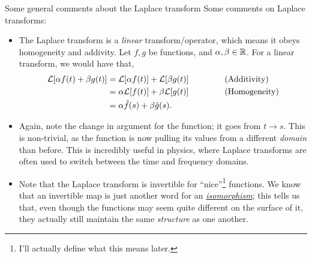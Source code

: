 \documentclass[11pt]{article}
\theoremstyle{mystyle}
\begin{document}
\begin{psremark}{Some general comments about the Laplace transform}{}
    Some comments on Laplace transforms:
    \begin{itemize}
        \item The Laplace transform is a \emph{linear} transform/operator,
        which means it obeys homogeneity and addivity. Let $f, g$
        be functions, and $\alpha, \beta \in \mathbb{R}$. 
        For a linear transform, we would have that,
        \begin{align*}
            \mathcal{L}[\alpha f(t) + \beta g(t)] & = \mathcal{L}[\alpha f(t)] + \mathcal{L}[\beta g(t)] \hspace{1.5cm} \text{(Additivity)}\\
            & = \alpha \mathcal{L}[f(t)] + \beta \mathcal{L}[g(t)] \hspace{1.5cm} \text{(Homogeneity)}\\
            & = \alpha \tilde{f}(s) + \beta \tilde{g}(s).
        \end{align*}
        \item Again, note the change in argument for the function;
        it goes from $t \to s$. This is non-trivial, as the function
        is now pulling its values from a different \emph{domain}
        than before. This is incredibly useful in physics,
        where Laplace transforms are often used to switch
        between the time and frequency domains.
        \item Note that the Laplace transform is invertible
        for ``nice''\footnote{I'll actually define what this means later.} functions.
        We know that an invertible map is just another word for 
        an \href{https://en.wikipedia.org/wiki/Isomorphism}{\emph{isomorphism}}; this tells us that, even though
        the functions may seem quite different on the surface
        of it, they actually still maintain the same \emph{structure}
        as one another.
    \end{itemize}
\end{psremark}
\end{document}
